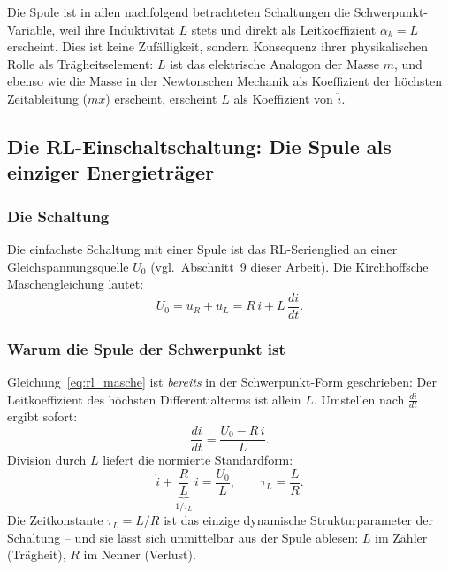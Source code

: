﻿\documentclass[12pt, a4paper]{article}
\begin{document}
	Die Spule ist in allen nachfolgend betrachteten Schaltungen die
	Schwerpunkt-Variable, weil ihre Induktivität $L$ stets und direkt als
	Leitkoeffizient $\alpha_k = L$ erscheint. Dies ist keine Zufälligkeit,
	sondern Konsequenz ihrer physikalischen Rolle als Trägheitselement: $L$
	ist das elektrische Analogon der Masse $m$, und ebenso wie die Masse in
	der Newtonschen Mechanik als Koeffizient der höchsten Zeitableitung
	($m\ddot{x}$) erscheint, erscheint $L$ als Koeffizient von $\ddot{i}$.
	
	\subsection{Die RL-Einschaltschaltung: Die Spule als einziger Energieträger}
	\label{sec:schwerpunkt_rl}
	
	\subsubsection*{Die Schaltung}
	
	Die einfachste Schaltung mit einer Spule ist das RL-Serienglied an einer
	Gleichspannungsquelle $U_0$ (vgl.\ Abschnitt~9 dieser Arbeit). Die
	Kirchhoffsche Maschengleichung lautet:
	\begin{equation}
		U_0 = u_R + u_L = R\,i + L\,\frac{di}{dt}.
		\label{eq:rl_masche}
	\end{equation}
	
	\subsubsection*{Warum die Spule der Schwerpunkt ist}
	
	Gleichung~\eqref{eq:rl_masche} ist \emph{bereits} in der Schwerpunkt-Form
	geschrieben: Der Leitkoeffizient des höchsten Differentialterms ist allein
	$L$. Umstellen nach $\frac{di}{dt}$ ergibt sofort:
	\begin{equation}
		\frac{di}{dt} = \frac{U_0 - R\,i}{L}.
		\label{eq:rl_dgl}
	\end{equation}
	Division durch $L$ liefert die normierte Standardform:
	\begin{equation}
		\dot{i} + \underbrace{\frac{R}{L}}_{\displaystyle 1/\tau_L}\,i
		= \frac{U_0}{L},
		\qquad \tau_L = \frac{L}{R}.
		\label{eq:rl_standardform}
	\end{equation}
	Die Zeitkonstante $\tau_L = L/R$ ist das einzige dynamische
	Strukturparameter der Schaltung -- und sie lässt sich unmittelbar aus der
	Spule ablesen: $L$ im Zähler (Trägheit), $R$ im Nenner (Verlust).
	
\end{document}
